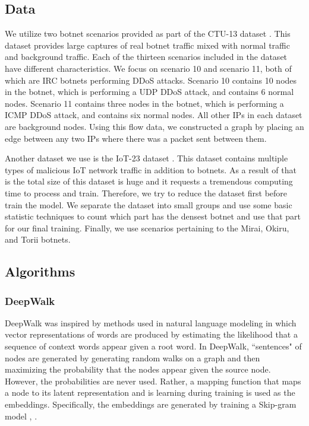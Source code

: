 \documentclass[10pt]{article}
\begin{document}
\begin{multicols}{2}
\subsection{Data}
We utilize two botnet scenarios provided as part of the CTU-13 dataset \cite{Garcia}. This dataset provides large captures of real botnet traffic mixed with normal traffic and background traffic. Each of the thirteen scenarios included in the dataset have different characteristics. We focus on scenario 10 and scenario 11, both of which are IRC botnets performing DDoS attacks. Scenario 10 contains 10 nodes in the botnet, which is performing a UDP DDoS attack, and contains 6 normal nodes. Scenario 11 contains three nodes in the botnet, which is performing a ICMP DDoS attack, and contains six normal nodes. All other IPs in each dataset are background nodes. Using this flow data, we constructed a graph by placing an edge between any two IPs where there was a packet sent between them. 

Another dataset we use is the IoT-23 dataset \cite{IoT-23}. This dataset contains multiple types of malicious IoT network traffic in addition to botnets. As a result of that is the total size of this dataset is huge and it requests a tremendous computing time to process and train. Therefore, we try to reduce the dataset first before train the model. We separate the dataset into small groups and use some basic statistic techniques to count which part has the densest botnet and use that part for our final training. Finally, we use scenarios pertaining to the Mirai, Okiru, and Torii botnets. 

\subsection{Algorithms}
 \subsubsection{DeepWalk}
DeepWalk \cite{Perozzi} was inspired by methods used in natural language modeling in which vector representations of words are produced by estimating the likelihood that a sequence of context words appear given a root word. In DeepWalk, ``sentences" of nodes are generated by generating random walks on a graph and then maximizing the probability that the nodes appear given the source node. However, the probabilities are never used. Rather, a mapping function that maps a node to its latent representation and is learning during training is used as the embeddings. Specifically, the embeddings are generated by training a Skip-gram model \cite{Mikolov}, \cite{Perozzi}.


\end{multicols}
\end{document}

